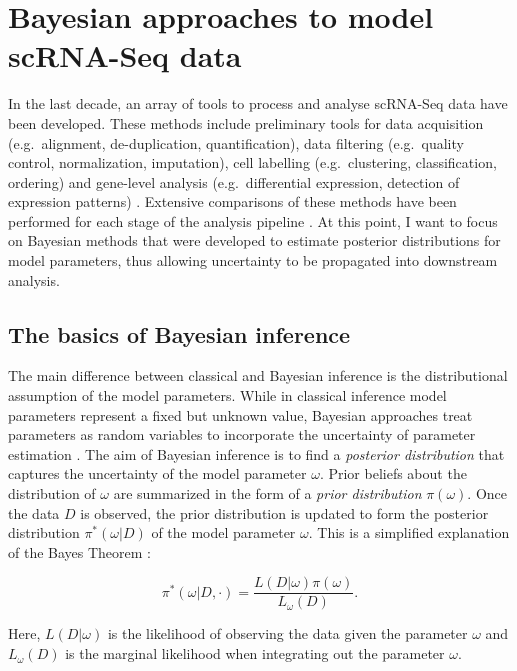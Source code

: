 
\section{Bayesian approaches to model scRNA-Seq data}

In the last decade, an array of tools to process and analyse scRNA-Seq data have been developed. These methods include preliminary tools for data acquisition (e.g.~alignment, de-duplication, quantification), data filtering (e.g.~quality control, normalization, imputation), cell labelling (e.g.~clustering, classification, ordering) and gene-level analysis (e.g.~differential expression, detection of expression patterns) \citep{Zappia2018}. Extensive comparisons of these methods have been performed for each stage of the analysis pipeline \citep{Saelens2018, Soneson2018}. At this point, I want to focus on Bayesian methods that were developed to estimate posterior distributions for model parameters, thus allowing uncertainty to be propagated into downstream analysis. 

\subsection{The basics of Bayesian inference}

The main difference between classical and Bayesian inference is the distributional assumption of the model parameters. While in classical inference model parameters represent a fixed but unknown value, Bayesian approaches treat parameters as random variables to incorporate the uncertainty of parameter estimation \citep{Bernardo2003}. The aim of Bayesian inference is to find a \emph{posterior distribution} that captures the uncertainty of the model parameter $\omega$. Prior beliefs about the distribution of $\omega$ are summarized in the form of a \emph{prior distribution} $\pi(\omega)$. Once the data $D$ is observed, the prior distribution is updated to form the posterior distribution $\pi^*(\omega|D)$ of the model parameter $\omega$. This is a simplified explanation of the Bayes Theorem \cite{Bayes1763}:

\begin{equation} \label{eq0:Bayes_theorem}
\pi^*(\omega|D,\cdot)=\frac{L(D|\omega)\pi(\omega)}{L_\omega(D)}.
\end{equation}

Here, $L(D|\omega)$ is the likelihood of observing the data given the parameter $\omega$ and $L_\omega(D)$ is the marginal likelihood when integrating out the parameter $\omega$.\\

